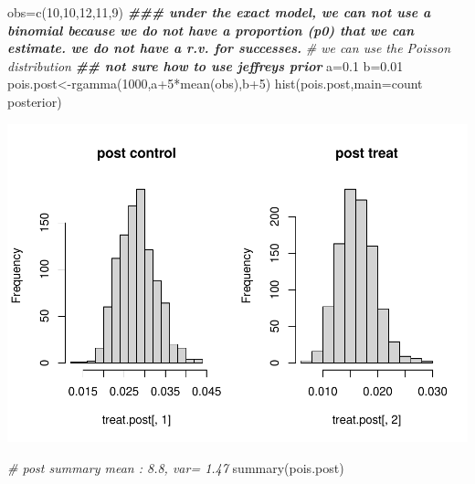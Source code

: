 \documentclass[
]{book}
\newenvironment{Shaded}{\begin{snugshade}}{\end{snugshade}}
\newcommand{\AttributeTok}[1]{\textcolor[rgb]{0.77,0.63,0.00}{#1}}
\newcommand{\CommentTok}[1]{\textcolor[rgb]{0.56,0.35,0.01}{\textit{#1}}}
\newcommand{\DecValTok}[1]{\textcolor[rgb]{0.00,0.00,0.81}{#1}}
\newcommand{\DocumentationTok}[1]{\textcolor[rgb]{0.56,0.35,0.01}{\textbf{\textit{#1}}}}
\newcommand{\FloatTok}[1]{\textcolor[rgb]{0.00,0.00,0.81}{#1}}
\newcommand{\FunctionTok}[1]{\textcolor[rgb]{0.00,0.00,0.00}{#1}}
\newcommand{\NormalTok}[1]{#1}
\newcommand{\OtherTok}[1]{\textcolor[rgb]{0.56,0.35,0.01}{#1}}
\newcommand{\SpecialCharTok}[1]{\textcolor[rgb]{0.00,0.00,0.00}{#1}}
\newcommand{\StringTok}[1]{\textcolor[rgb]{0.31,0.60,0.02}{#1}}
\theoremstyle{definition}
\theoremstyle{definition}
\theoremstyle{definition}
\theoremstyle{definition}
\theoremstyle{remark}
\begin{document}
\begin{Shaded}
\begin{Highlighting}[]
\NormalTok{ obs}\OtherTok{=}\FunctionTok{c}\NormalTok{(}\DecValTok{10}\NormalTok{,}\DecValTok{10}\NormalTok{,}\DecValTok{12}\NormalTok{,}\DecValTok{11}\NormalTok{,}\DecValTok{9}\NormalTok{)}
 \DocumentationTok{\#\#\# under the exact model, we can not use a binomial because we do not have a proportion (p0) that we can estimate. we do not have a r.v. for \textquotesingle{}successes\textquotesingle{}.}
 \CommentTok{\# we can use the Poisson distribution }
 \DocumentationTok{\#\# not sure how to use jeffreys prior}
\NormalTok{  a}\OtherTok{=}\FloatTok{0.1}
\NormalTok{  b}\OtherTok{=}\FloatTok{0.01}
\NormalTok{  pois.post}\OtherTok{\textless{}{-}}\FunctionTok{rgamma}\NormalTok{(}\DecValTok{1000}\NormalTok{,a}\SpecialCharTok{+}\DecValTok{5}\SpecialCharTok{*}\FunctionTok{mean}\NormalTok{(obs),b}\SpecialCharTok{+}\DecValTok{5}\NormalTok{)}
  \FunctionTok{hist}\NormalTok{(pois.post,}\AttributeTok{main=}\StringTok{\textquotesingle{}count posterior\textquotesingle{}}\NormalTok{)}
\end{Highlighting}
\end{Shaded}

\includegraphics{_main_files/figure-latex/unnamed-chunk-36-1.pdf}

\begin{Shaded}
\begin{Highlighting}[]
  \CommentTok{\# post summary  mean : 8.8,  var= 1.47}
  \FunctionTok{summary}\NormalTok{(pois.post)}
\end{Highlighting}
\end{Shaded}
\end{document}
